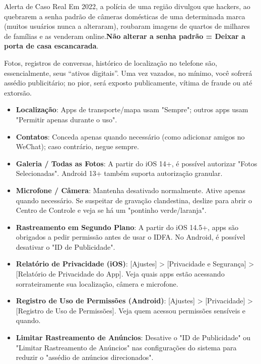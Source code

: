 \begin{tcbwarn}{Alerta de Caso Real}
Em 2022, a polícia de uma região divulgou que hackers, ao quebrarem a senha padrão de câmeras domésticas de uma determinada marca (muitos usuários nunca a alteraram), roubaram imagens de quartos de milhares de famílias e as venderam online.\textbf{Não alterar a senha padrão = Deixar a porta de casa escancarada}.

\end{tcbwarn}


Fotos, registros de conversas, histórico de localização no telefone são, essencialmente, seus “ativos digitais”. Uma vez vazados, no mínimo, você sofrerá assédio publicitário; no pior, será exposto publicamente, vítima de fraude ou até extorsão.


\begin{itemize}
  \item \textbf{Localização}: Apps de transporte/mapa usam "Sempre"; outros apps usam "Permitir apenas durante o uso".
  \item \textbf{Contatos}: Conceda apenas quando necessário (como adicionar amigos no WeChat); caso contrário, negue sempre.
  \item \textbf{Galeria / Todas as Fotos}: A partir do iOS 14+, é possível autorizar "Fotos Selecionadas". Android 13+ também suporta autorização granular.
  \item \textbf{Microfone / Câmera}: Mantenha desativado normalmente. Ative apenas quando necessário. Se suspeitar de gravação clandestina, deslize para abrir o Centro de Controle e veja se há um "pontinho verde/laranja".
  \item \textbf{Rastreamento em Segundo Plano}: A partir do iOS 14.5+, apps são obrigados a pedir permissão antes de usar o IDFA. No Android, é possível desativar o "ID de Publicidade".
\end{itemize}


\begin{itemize}
  \item \textbf{Relatório de Privacidade (iOS)}: [Ajustes] > [Privacidade e Segurança] > [Relatório de Privacidade do App]. Veja quais apps estão acessando sorrateiramente sua localização, câmera e microfone.
  \item \textbf{Registro de Uso de Permissões (Android)}: [Ajustes] > [Privacidade] > [Registro de Uso de Permissões]. Veja quem acessou permissões sensíveis e quando.
  \item \textbf{Limitar Rastreamento de Anúncios}: Desative o "ID de Publicidade" ou "Limitar Rastreamento de Anúncios" nas configurações do sistema para reduzir o "assédio de anúncios direcionados".
\end{itemize}

